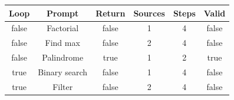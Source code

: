 \begin{table}[h]
\centering
\begin{tabular}{ |c|c|c|c|c|c| }
\hline
Loop & Prompt & Return & Sources & Steps & Valid \\
\hline
false & Factorial & false & 1 & 4 & false \\
\hline
false & Find max & false & 2 & 4 & false \\
\hline
false & Palindrome & true & 1 & 2 & true \\
\hline
true & Binary search & false & 1 & 4 & false \\
\hline
true & Filter & false & 2 & 4 & false \\
\hline
\end{tabular}
\end{table}
